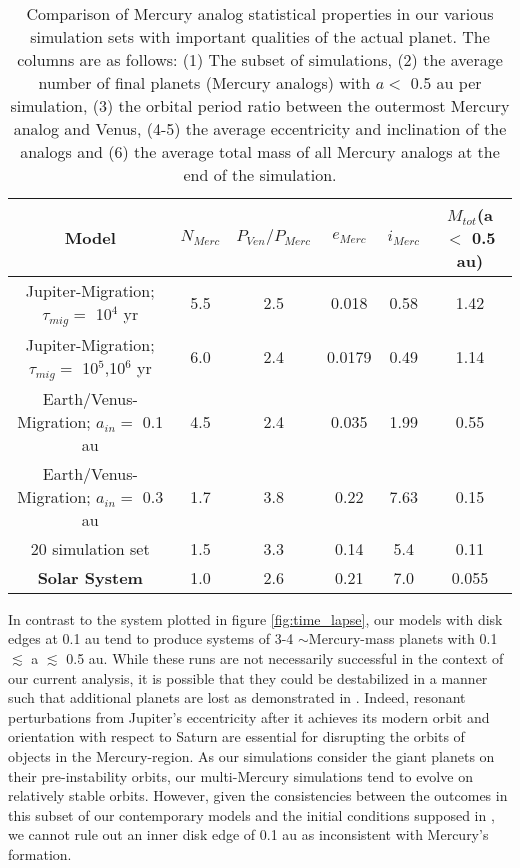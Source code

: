 \documentclass[trackchanges,twocolumn]{aastex}
\begin{document}
\begin{table*}
\centering
\begin{tabular}{c c c c c c}
\hline
Model & $N_{Merc}$ & $P_{Ven}/P_{Merc}$ & $e_{Merc}$ & $i_{Merc}$ & $M_{tot}$(a $<$ 0.5 au) \\
\hline
Jupiter-Migration; $\tau_{mig}=$ 10$^{4}$ yr & 5.5 & 2.5 & 0.018 & 0.58 & 1.42 \\
Jupiter-Migration; $\tau_{mig}=$ 10$^{5}$,10$^{6}$ yr & 6.0 & 2.4 & 0.0179 & 0.49 & 1.14 \\
Earth/Venus-Migration; $a_{in}=$ 0.1 au & 4.5 & 2.4 & 0.035 & 1.99 & 0.55 \\
Earth/Venus-Migration; $a_{in}=$ 0.3 au & 1.7 & 3.8 & 0.22 & 7.63 & 0.15 \\
20 simulation set & 1.5 & 3.3 & 0.14 & 5.4 & 0.11 \\
\hline
\textbf{Solar System} & 1.0 & 2.6 & 0.21 & 7.0 & 0.055 \\
\hline
\end{tabular}
\caption{Comparison of Mercury analog statistical properties in our various simulation sets with important qualities of the actual planet.  The columns are as follows: (1) The subset of simulations, (2) the average number of final planets (Mercury analogs) with $a<$ 0.5 au per simulation, (3) the orbital period ratio between the outermost Mercury analog and Venus, (4-5) the average eccentricity and inclination of the analogs and (6) the average total mass of all Mercury analogs at the end of the simulation.}
\label{table:mercs}
\end{table*}

In contrast to the system plotted in figure \ref{fig:time_lapse}, our models with disk edges at 0.1 au tend to produce systems of 3-4 $\sim$Mercury-mass planets with 0.1 $\lesssim$ a $\lesssim$ 0.5 au.  While these runs are not necessarily successful in the context of our current analysis, it is possible that they could be destabilized in a manner such that additional planets are lost as demonstrated in \citet{clement21_merc3}.  Indeed, resonant perturbations from Jupiter's eccentricity after it achieves its modern orbit and orientation with respect to Saturn \citep{nesvorny12,batygin15b} are essential for disrupting the orbits of objects in the Mercury-region.  As our simulations consider the giant planets on their pre-instability orbits, our multi-Mercury simulations tend to evolve on relatively stable orbits.  However, given the consistencies between the outcomes in this subset of our contemporary models and the initial conditions supposed in \citet{clement21_merc3}, we cannot rule out an inner disk edge of 0.1 au as inconsistent with Mercury's formation.
\end{document}
